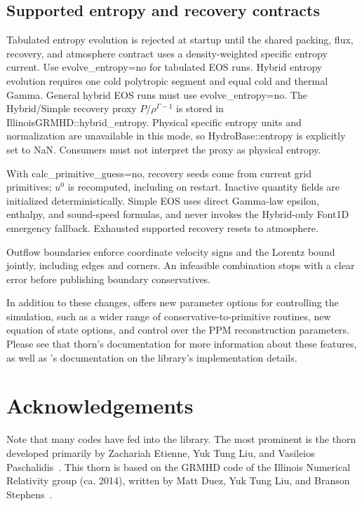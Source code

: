 \documentclass{article}
\begin{document}
\subsection{Supported entropy and recovery contracts}
Tabulated entropy evolution is rejected at startup until the shared \grhayl{}
packing, flux, recovery, and atmosphere contract uses a density-weighted
specific entropy current. Use evolve\_entropy=no for tabulated EOS runs.
Hybrid entropy evolution requires one cold polytropic segment and equal cold
and thermal Gamma. General hybrid EOS runs must use evolve\_entropy=no.
The Hybrid/Simple recovery proxy $P/\rho^{\Gamma-1}$ is stored in
IllinoisGRMHD::hybrid\_entropy. Physical specific entropy units and normalization
are unavailable in this mode, so HydroBase::entropy is explicitly set to NaN.
Consumers must not interpret the proxy as physical entropy.

With calc\_primitive\_guess=no, recovery seeds come from current grid
primitives; $u^0$ is recomputed, including on restart. Inactive quantity fields
are initialized deterministically. Simple EOS uses direct Gamma-law epsilon,
enthalpy, and sound-speed formulas, and never invokes the Hybrid-only Font1D
emergency fallback. Exhausted supported recovery resets to atmosphere.

Outflow boundaries enforce coordinate velocity signs and the Lorentz bound
jointly, including edges and corners. An infeasible combination stops with a
clear error before publishing boundary conservatives.

In addition to these changes, \glib{} offers new parameter options for
controlling the simulation, such as a wider range of conservative-to-primitive
routines, new equation of state options, and control over the PPM reconstruction
parameters. Please see that thorn's documentation for more information about these
features, as well as \grhayl's documentation on the library's implementation
details.

\section{Acknowledgements}

Note that many codes have fed into the \grhayl{} library. The most prominent is
the \igm{} thorn developed primarily by Zachariah Etienne, Yuk Tung Liu, and
Vasileios Paschalidis~\cite{WVUThorns_IllinoisGRMHD_Etienne:2015cea}. This
thorn is based on the GRMHD code of the Illinois Numerical Relativity group
(ca. 2014), written by Matt Duez, Yuk Tung Liu, and Branson Stephens~.
\end{document}

